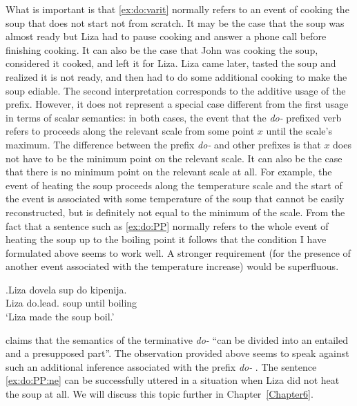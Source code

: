What is important is that \ref{ex:do:varit} normally refers to an event of cooking the soup that does not start not from scratch. It may be the case that the soup was almost ready but Liza had to pause cooking and answer a phone call before finishing cooking. It can also be the case that John was cooking the soup, considered it cooked, and left it for Liza. Liza came later, tasted the soup and realized it is not ready, and then had to do some additional cooking to make the soup ediable. The second interpretation corresponds to the additive usage of the prefix. However, it does not represent a special case different from the first usage in terms of scalar semantics: in both cases, the event that the \textit{do-}  prefixed verb refers to proceeds along the relevant scale from some point $x$ until the scale's maximum. The difference between the prefix \textit{do-}   and other prefixes is that $x$ does not have to be the minimum point on the relevant scale. It can also be the case that there is no minimum point on the relevant scale at all. For example, the event of heating the soup proceeds along the temperature scale and the start of the event is associated with some temperature of the soup that cannot be easily reconstructed, but is definitely not equal to the minimum of the scale. From the fact that a sentence such as \ref{ex:do:PP} normally refers to the whole event of heating the soup up to the boiling point it follows that the condition I have formulated above seems to work well. A stronger requirement (for the presence of another event associated with the temperature increase) would be superfluous.

\exg.\label{ex:do:PP}Liza dovela sup do kipenija.\\
Liza do.lead. soup until boiling\\
\trans `Liza made the soup boil.'

\citet[75]{Kagan:book} claims that the semantics of the terminative  \textit{do-}   ``can be divided into an entailed and a presupposed part''. The observation provided above seems to speak against such an additional inference associated with the prefix \textit{do-}  . The sentence \ref{ex:do:PP:ne} can be successfully uttered in a situation when Liza did not heat the soup at all. We will discuss this topic further in Chapter~\ref{Chapter6}.

